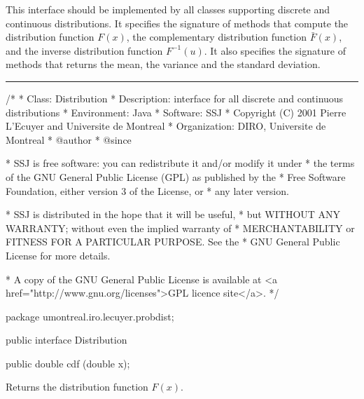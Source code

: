 
This interface should be implemented by all classes supporting 
discrete and continuous distributions. %
It specifies the signature of methods that compute
the distribution function $F(x)$,
the complementary distribution function $\bar F(x)$,
and the inverse distribution function $ F^{-1} (u)$.
%
It also specifies the signature of methods that returns the mean,
the variance and the standard deviation.

\bigskip\hrule

\begin{code}
\begin{hide}
/*
 * Class:        Distribution
 * Description:  interface for all discrete and continuous distributions
 * Environment:  Java
 * Software:     SSJ 
 * Copyright (C) 2001  Pierre L'Ecuyer and Universite de Montreal
 * Organization: DIRO, Universite de Montreal
 * @author       
 * @since

 * SSJ is free software: you can redistribute it and/or modify it under
 * the terms of the GNU General Public License (GPL) as published by the
 * Free Software Foundation, either version 3 of the License, or
 * any later version.

 * SSJ is distributed in the hope that it will be useful,
 * but WITHOUT ANY WARRANTY; without even the implied warranty of
 * MERCHANTABILITY or FITNESS FOR A PARTICULAR PURPOSE.  See the
 * GNU General Public License for more details.

 * A copy of the GNU General Public License is available at
   <a href="http://www.gnu.org/licenses">GPL licence site</a>.
 */
\end{hide}
package umontreal.iro.lecuyer.probdist;


public interface Distribution\begin{hide} {\end{hide}

   public double cdf (double x);
\end{code}
\begin{tabb} Returns the distribution function $F(x)$.
\end{tabb}
\begin{htmlonly}
\end{htmlonly}
